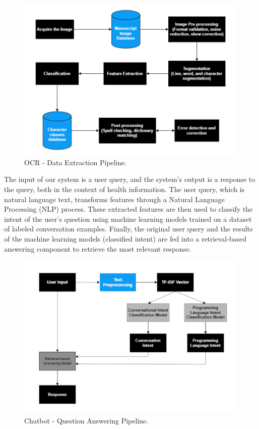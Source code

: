 \documentclass[conference]{IEEEtran}
\begin{document}
    \begin{figure}[htbp]
        \centerline{\includegraphics[scale=0.6]{Figures/OCR pipeline.PNG}}
        \caption{OCR - Data Extraction Pipeline.}
    \label{Fig. 1}
    \end{figure}

    The input of our system is a user query, and the system's output is a response to the query, both in the context of health information. The user query, which is natural language text, transforms features through a Natural Language Processing (NLP) process. These extracted features are then used to classify the intent of the user's question using machine learning models trained on a dataset of labeled conversation examples. Finally, the original user query and the results of the machine learning models (classified intent) are fed into a retrieval-based answering component to retrieve the most relevant response.
    
    \begin{figure}[htbp]
        \centerline{\includegraphics[scale=0.8]{Figures/Chatbot PipeLine.PNG}}
        \caption{Chatbot - Question Answering Pipeline.}
    \label{Fig. 2}
    \end{figure}
\end{document}
